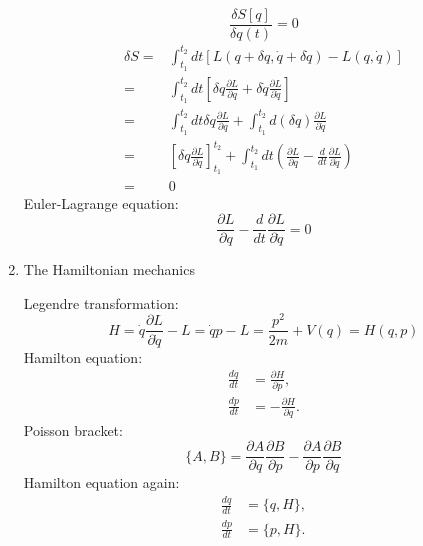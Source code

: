 \documentclass[12pt]{article}
\numberwithin{equation}{section}
\begin{document}
\begin{enumerate}
\begin{equation}
		\frac{\delta S[q]}{\delta q(t)} = 0
	\end{equation}
	\begin{equation} \begin{aligned}
		\delta S =& \int_{t_1}^{t_2}dt[L(q+\delta q, \dot{q}+\delta \dot{q})-L(q,\dot{q})] \\
		=&\int_{t_1}^{t_2}dt[\delta q \frac{\partial L}{\partial q}+\delta \dot{q} \frac{\partial L}{\partial \dot{q}}] \\
		=&\int_{t_1}^{t_2}dt\delta q \frac{\partial L}{\partial q}+\int_{t_1}^{t_2}d(\delta q) \frac{\partial L}{\partial \dot{q}} \\
		=&[\delta q \frac{\partial L}{\partial \dot{q}}]_{t_1}^{t_2}+\int_{t_1}^{t_2}dt(\frac{\partial L}{\partial q}-\frac{d}{dt}\frac{\partial L}{\partial \dot{q}}) \\
		=&0
	\end{aligned} \end{equation}
	{\color{blue}Euler-Lagrange equation}:
	\begin{equation}
		\frac{\partial L}{\partial q}-\frac{d}{dt}\frac{\partial L}{\partial \dot{q}}=0
	\end{equation}
\item The Hamiltonian mechanics \par
	Legendre transformation:
	\begin{equation}
		H=\dot{q}\frac{\partial L}{\partial \dot{q}}-L=\dot{q}p-L=\frac{p^2}{2m}+V(q)=H(q, p)
	\end{equation}
	Hamilton equation:
	\begin{equation}\begin{aligned}
		\frac{dq}{dt}&=\frac{\partial H}{\partial p},\\
		\frac{dp}{dt}&=-\frac{\partial H}{\partial q}.
	\end{aligned}\end{equation}
	Poisson bracket:
	\begin{equation}
		\{A, B\}=\frac{\partial A}{\partial q}\frac{\partial B}{\partial p} -\frac{\partial A}{\partial p}\frac{\partial B}{\partial q} 
	\end{equation}
	{\color{blue}Hamilton equation again}:
	\begin{equation}\begin{aligned}
		\frac{dq}{dt}&=\{q, H\},\\
		\frac{dp}{dt}&=\{p, H\}.
	\end{aligned}\end{equation}
\end{enumerate}
\end{document}
